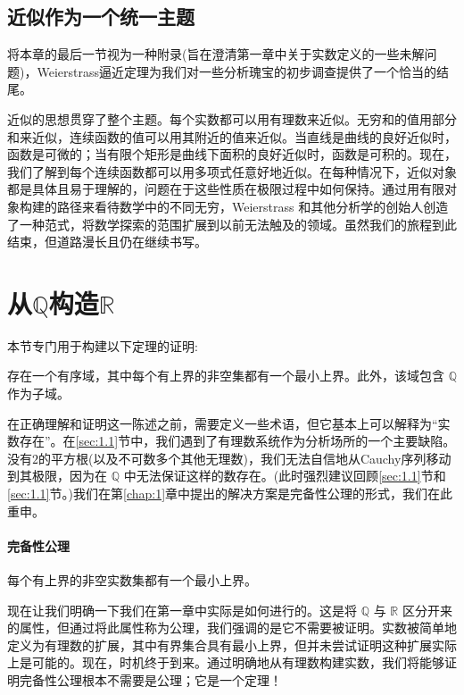 \subsection{近似作为一个统一主题}

将本章的最后一节视为一种附录(旨在澄清第一章中关于实数定义的一些未解问题)，Weierstrass逼近定理为我们对一些分析瑰宝的初步调查提供了一个恰当的结尾。

近似的思想贯穿了整个主题。每个实数都可以用有理数来近似。无穷和的值用部分和来近似，连续函数的值可以用其附近的值来近似。当直线是曲线的良好近似时，函数是可微的；当有限个矩形是曲线下面积的良好近似时，函数是可积的。现在，我们了解到每个连续函数都可以用多项式任意好地近似。在每种情况下，近似对象都是具体且易于理解的，问题在于这些性质在极限过程中如何保持。通过用有限对象构建的路径来看待数学中的不同无穷，Weierstrass 和其他分析学的创始人创造了一种范式，将数学探索的范围扩展到以前无法触及的领域。虽然我们的旅程到此结束，但道路漫长且仍在继续书写。

\section{从$\mathbb{Q}$构造$\mathbb{R}$}
\label{sec:8.4}

本节专门用于构建以下定理的证明:
\begin{Thm}
  \label{thm:8.4.1}
  存在一个有序域，其中每个有上界的非空集都有一个最小上界。此外，该域包含 \(\mathbb{Q}\) 作为子域。
\end{Thm}

在正确理解和证明这一陈述之前，需要定义一些术语，但它基本上可以解释为“实数存在”。在\ref{sec:1.1}节中，我们遇到了有理数系统作为分析场所的一个主要缺陷。没有$2$的平方根(以及不可数多个其他无理数)，我们无法自信地从Cauchy序列移动到其极限，因为在 \(\mathbb{Q}\) 中无法保证这样的数存在。(此时强烈建议回顾\ref{sec:1.1}节和\ref{sec:1.1}节。)我们在第\ref{chap:1}章中提出的解决方案是完备性公理的形式，我们在此重申。

\paragraph{完备性公理} 每个有上界的非空实数集都有一个最小上界。

现在让我们明确一下我们在第一章中实际是如何进行的。这是将 \(\mathbb{Q}\) 与 \(\mathbb{R}\) 区分开来的属性，但通过将此属性称为公理，我们强调的是它不需要被证明。实数被简单地定义为有理数的扩展，其中有界集合具有最小上界，但并未尝试证明这种扩展实际上是可能的。现在，时机终于到来。通过明确地从有理数构建实数，我们将能够证明完备性公理根本不需要是公理；它是一个定理！

